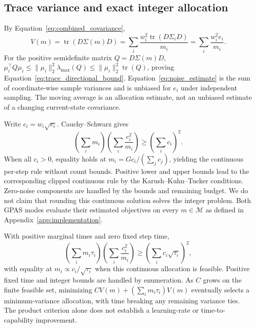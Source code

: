 \subsection{Trace variance and exact integer allocation}
\label{app:allocation_proofs}

By Equation~\ref{eq:combined_covariance},
\begin{equation}
    V(m)=\operatorname{tr}(D\Sigma(m)D)
      =\sum_i\frac{w_i^2\operatorname{tr}(D\Sigma_iD)}{m_i}
      =\sum_i\frac{w_i^2e_i}{m_i}.
\end{equation}
For the positive semidefinite matrix $Q=D\Sigma(m)D$,
$\mu_i^\top Q\mu_i\leq\|\mu_i\|_2^2\lambda_{\max}(Q)
\leq\|\mu_i\|_2^2\operatorname{tr}(Q)$, proving
Equation~\ref{eq:trace_directional_bound}.
Equation~\ref{eq:noise_estimate} is the sum of coordinate-wise sample
variances and is unbiased for $e_i$ under independent sampling.
The moving average is an allocation estimate, not an unbiased estimate
of a changing current-state covariance.

Write $c_i=w_i\sqrt{e_i}$. Cauchy--Schwarz gives
\begin{equation}
    \left(\sum_i m_i\right)
    \left(\sum_i\frac{c_i^2}{m_i}\right)
      \geq\left(\sum_i c_i\right)^2.
\end{equation}
When all $c_i>0$, equality holds at
$m_i=Gc_i/(\sum_jc_j)$, yielding the continuous per-step rule without
count bounds. Positive lower and upper bounds lead to the corresponding clipped
continuous rule by the Karush--Kuhn--Tucker conditions. Zero-noise
components are handled by the bounds and remaining budget.
We do not claim that rounding this continuous solution solves the
integer problem. Both GPAS modes evaluate their estimated objectives
on every $m\in\mathcal M$ as defined in
Appendix~\ref{app:implementation}.

With positive marginal times and zero fixed step time,
\begin{equation}
    \left(\sum_i m_i\tau_i\right)
    \left(\sum_i\frac{c_i^2}{m_i}\right)
      \geq\left(\sum_i c_i\sqrt{\tau_i}\right)^2,
\end{equation}
with equality at $m_i\propto c_i/\sqrt{\tau_i}$ when this continuous
allocation is feasible. Positive fixed time and integer bounds are
handled by enumeration. As $C$ grows on the finite feasible set,
minimizing $CV(m)+(\sum_i m_i\tau_i)V(m)$ eventually selects a
minimum-variance allocation, with time breaking any remaining variance
ties. The product criterion alone does not establish a learning-rate
or time-to-capability improvement.

